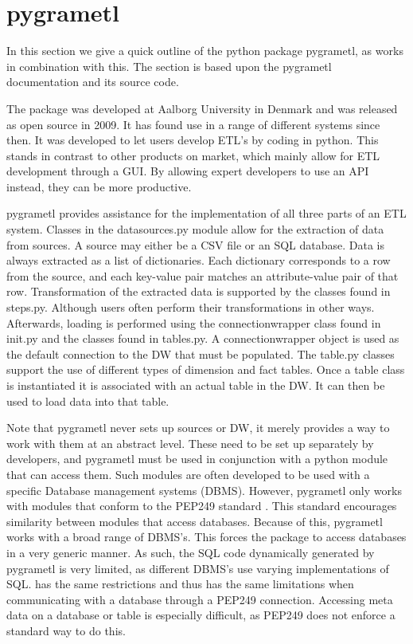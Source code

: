 \section{pygrametl}\label{sect:pygrametl}
In this section we give a quick outline of the python package pygrametl, as \FW{} works in combination with this. The section is based upon the pygrametl documentation and its source code\cite{pygramSource}.   

The package was developed at Aalborg University in Denmark and was released as open source in 2009. It has found use in a range of different systems since then. It was developed to let users develop ETL's by coding in python. This stands in contrast to other products on market, which mainly allow for ETL development through a GUI. By allowing expert developers to use an API instead, they can be more productive.

pygrametl provides assistance for the implementation of all three parts of an ETL system. Classes in the datasources.py module allow for the extraction of data from sources. A source may either be a CSV file or an SQL database. Data is always extracted as a list of dictionaries. Each dictionary corresponds to a row from the source, and each key-value pair matches an attribute-value pair of that row. Transformation of the extracted data is supported by the classes found in steps.py. Although users often perform their transformations in other ways. Afterwards, loading is performed using the connectionwrapper class found in init.py and the classes found in tables.py. A connectionwrapper object is used as the default connection to the DW that must be populated. The table.py classes support the use of different types of dimension and fact tables. Once a table class is instantiated it is associated with an actual table in the DW. It can then be used to load data into that table. 

Note that pygrametl never sets up sources or DW, it merely provides a way to work with them at an abstract level. These need to be set up separately by developers, and pygrametl must be used in conjunction with a python module that can access them. Such modules are often developed to be used with a specific Database management systems (DBMS). However, pygrametl only works with modules that conform to the PEP249 standard \cite{pep249}. This standard encourages similarity between modules that access databases. Because of this, pygrametl works with a broad range of DBMS's. This forces the package to access databases in a very generic manner. As such, the SQL code dynamically generated by pygrametl is very limited, as different DBMS's use varying implementations of SQL. \FW{} has the same restrictions and thus has the same limitations when communicating with a database through a PEP249 connection. Accessing meta data on a database or table is especially difficult, as PEP249 does not enforce a standard way to do this. 
    
